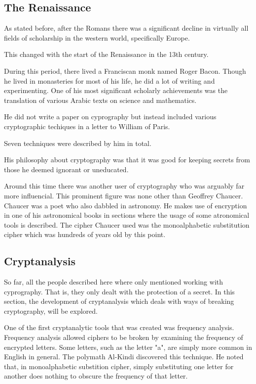 \documentclass{article}
\begin{document}
    \subsection{The Renaissance}

    As stated before, after the Romans there was a significant decline in
    virtually all fields of scholarship in the western world, specifically Europe.

    This changed with the start of the Renaissance in the 13th century.

    During this period, there lived a Franciscan monk named Roger Bacon.
    Though he lived in monasteries for most of his life, he did a lot of writing
    and experimenting.
    One of his most significant scholarly achievements was the translation
    of various Arabic texts on science and mathematics.
    
    He did not write a paper on cyprography but instead included various
    cryptographic techiques in a letter to William of Paris.

    Seven techniques were described by him in total.
   
    His philosophy about cryptography was that it was good for keeping secrets
    from those he deemed ignorant or uneducated.

    Around this time there was another user of cryptography who was arguably
    far more influencial. This prominent figure was none other than Geoffrey Chaucer.
    Chaucer was a poet who also dabbled in astronomy. He makes use of encryption
    in one of his astronomical books in sections where the usage of some atronomical tools
    is described.
    The cipher Chaucer used was the monoalphabetic substitution cipher which was hundreds
    of years old by this point.

    \subsection{Cryptanalysis}

    So far, all the people described here where only mentioned working with cyprography.
    That is, they only dealt with the protection of a secret. In this section, the development
    of cryptanalysis which deals with ways of breaking cryptography, will be explored.

    One of the first cryptanalytic tools that was created was frequency analysis.
    Frequency analysis allowed ciphers to be broken by examining the frequency of
    encrypted letters. Some letters, such as the letter "a", are simply more common
    in English in general.
    The polymath Al-Kindi discovered this technique. He noted that, in monoalphabetic
    substition cipher, simply substituting one letter for another does nothing
    to obscure the frequency of that letter.
\end{document}
